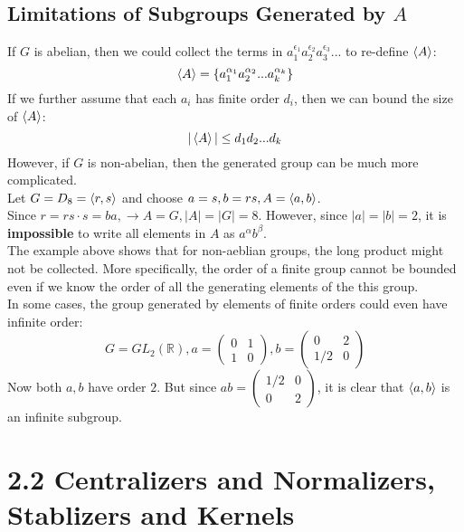 \documentclass{article}
\begin{document}
\subsection*{Limitations of Subgroups Generated by $A$}
If $G$ is abelian, then we could collect the terms in $a_1^{\epsilon_1}a_2^{\epsilon_2}a_3^{\epsilon_3}...$ to re-define $\braket{A}$:
\begin{equation*}
    \braket{A} = \{a_1^{\alpha_1}a_2^{\alpha_2}...a_k^{\alpha_k}\}
\end{equation*}
If we further assume that each $a_i$ has finite order $d_i$, then we can bound the size of $\braket{A}$:
\begin{equation*}
    |\braket{A}| \leq d_1d_2...d_k
\end{equation*}
However, if $G$ is non-abelian, then the generated group can be much more complicated.\\
Let $G = D_8 = \braket{r, s}$ and choose $a = s, b = rs, A = \braket{a, b}$.\\
Since $r = rs\cdot s = ba, \rightarrow A = G, |A| = |G| = 8$. However, since $|a| = |b| = 2$, it is \textbf{impossible} to write all elements in $A$ as $a^\alpha b^\beta$.\\
The example above shows that for non-aeblian groups, the long product might not be collected. More specifically, the order of a finite group cannot be bounded even if we know the order of all the generating elements of the this group.\\
In some cases, the group generated by elements of finite orders could even have infinite order:\\
\begin{equation*}
    G = GL_2(\mathbb{R}), a = \begin{pmatrix}
        0 & 1\\
        1 & 0
    \end{pmatrix}, b = \begin{pmatrix}
        0 & 2\\
        1/2 & 0
    \end{pmatrix}
\end{equation*}
Now both $a, b$ have order $2$. But since $ab = \begin{pmatrix}
    1/2 & 0\\
    0 & 2
\end{pmatrix}$, it is clear that $\braket{a, b}$ is an infinite subgroup.
\section*{2.2 Centralizers and Normalizers, Stablizers and Kernels}
\end{document}
